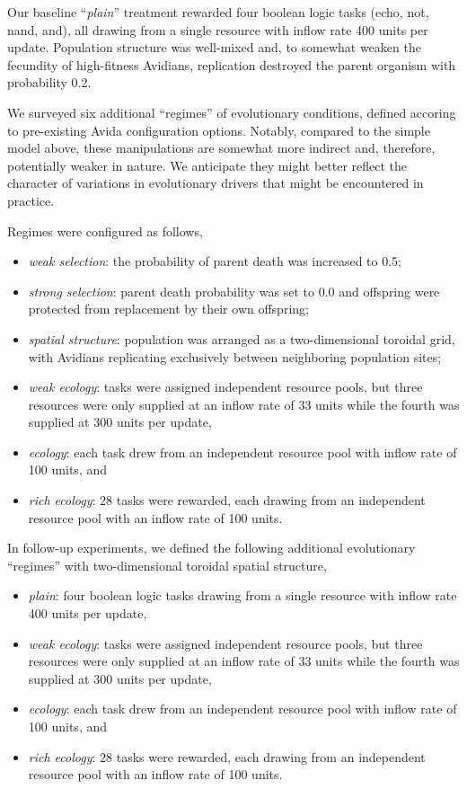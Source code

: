 Our baseline ``\textit{plain}'' treatment rewarded four boolean logic tasks (echo, not, nand, and), all drawing from a single resource with inflow rate 400 units per update.
Population structure was well-mixed and, to somewhat weaken the fecundity of high-fitness Avidians, replication destroyed the parent organism with probability 0.2.

We surveyed six additional ``regimes'' of evolutionary conditions, defined accoring to pre-existing Avida configuration options.
Notably, compared to the simple model above, these manipulations are somewhat more indirect and, therefore, potentially weaker in nature.
We anticipate they might better reflect the character of variations in evolutionary drivers that might be encountered in practice.

Regimes were configured as follows,
\begin{itemize}
  \item \textit{weak selection}: the probability of parent death was increased to 0.5;
  \item \textit{strong selection}: parent death probability was set to 0.0 and offspring were protected from replacement by their own offspring;
  \item \textit{spatial structure}: population was arranged as a two-dimensional toroidal grid, with Avidians replicating exclusively between neighboring population sites;
  \item \textit{weak ecology}: tasks were assigned independent resource pools, but three resources were only supplied at an inflow rate of 33 units while the fourth was supplied at 300 units per update,
  \item \textit{ecology}: each task drew from an independent resource pool with inflow rate of 100 units, and
  \item \textit{rich ecology}: 28 tasks were rewarded, each drawing from an independent resource pool with an inflow rate of 100 units.
\end{itemize}

In follow-up experiments, we defined the following additional evolutionary ``regimes'' with two-dimensional toroidal spatial structure,
\begin{itemize}
  \item \textit{plain}: four boolean logic tasks drawing from a single resource with inflow rate 400 units per update,
  \item \textit{weak ecology}: tasks were assigned independent resource pools, but three resources were only supplied at an inflow rate of 33 units while the fourth was supplied at 300 units per update,
  \item \textit{ecology}: each task drew from an independent resource pool with inflow rate of 100 units, and
  \item \textit{rich ecology}: 28 tasks were rewarded, each drawing from an independent resource pool with an inflow rate of 100 units.
\end{itemize}

